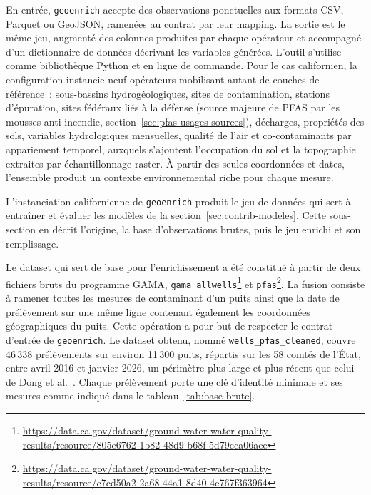 \label{sec:geoenrich-io}

En entr\'ee, \texttt{geoenrich} accepte des observations ponctuelles aux formats CSV, Parquet ou GeoJSON, ramen\'ees au contrat par leur mapping. La sortie est le m\^eme jeu, augment\'e des colonnes produites par chaque op\'erateur et accompagn\'e d'un dictionnaire de donn\'ees d\'ecrivant les variables g\'en\'er\'ees. L'outil s'utilise comme biblioth\`eque Python et en ligne de commande. Pour le cas californien, la configuration instancie neuf op\'erateurs mobilisant autant de couches de r\'ef\'erence~: sous-bassins hydrog\'eologiques, sites de contamination, stations d'\'epuration, sites f\'ed\'eraux li\'es \`a la d\'efense (source majeure de PFAS par les mousses anti-incendie, section~\ref{sec:pfas-usages-sources}), d\'echarges, propri\'et\'es des sols, variables hydrologiques mensuelles, qualit\'e de l'air et co-contaminants par appariement temporel, auxquels s'ajoutent l'occupation du sol et la topographie extraites par \'echantillonnage raster. \`A partir des seules coordonn\'ees et dates, l'ensemble produit un contexte environnemental riche pour chaque mesure.

\label{sec:geoenrich-dataset}

L'instanciation californienne de \texttt{geoenrich} produit le jeu de donn\'ees qui sert \`a entra\^iner et \'evaluer les mod\`eles de la section~\ref{sec:contrib-modeles}. Cette sous-section en d\'ecrit l'origine, la base d'observations brutes, puis le jeu enrichi et son remplissage.

\label{sec:geoenrich-dataset-origine}

Le dataset qui sert de base pour l'enrichissement a \'et\'e constitu\'e \`a partir de deux fichiers bruts du programme GAMA, \texttt{gama\_allwells}\footnote{\url{https://data.ca.gov/dataset/ground-water-water-quality-results/resource/805e6762-1b82-48d9-b68f-5d79cca06ace}} et \texttt{pfas}\footnote{\url{https://data.ca.gov/dataset/ground-water-water-quality-results/resource/c7cd50a2-2a68-44a1-8d40-4e767f363964}}. La fusion consiste \`a ramener toutes les mesures de contaminant d'un puits ainsi que la date de pr\'el\`evement sur une m\^eme ligne contenant \'egalement les coordonn\'ees g\'eographiques du puits. Cette op\'eration a pour but de respecter le contrat d'entr\'ee de \texttt{geoenrich}. Le dataset obtenu, nomm\'e \texttt{wells\_pfas\_cleaned}, couvre 46\,338 pr\'el\`evements sur environ 11\,300 puits, r\'epartis sur les 58 comt\'es de l'\'Etat, entre avril 2016 et janvier 2026, un p\'erim\`etre plus large et plus r\'ecent que celui de Dong et al.~\cite{dong2024pfas}. Chaque pr\'el\`evement porte une cl\'e d'identit\'e minimale et ses mesures comme indiqu\'e dans le tableau~\ref{tab:base-brute}.

